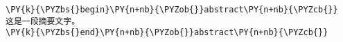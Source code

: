\begin{Verbatim}[commandchars=\\\{\}]
\PY{k}{\PYZbs{}begin}\PY{n+nb}{\PYZob{}}abstract\PY{n+nb}{\PYZcb{}}
这是一段摘要文字。
\PY{k}{\PYZbs{}end}\PY{n+nb}{\PYZob{}}abstract\PY{n+nb}{\PYZcb{}}
\end{Verbatim}
